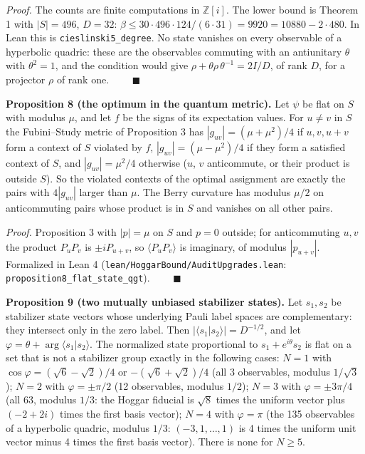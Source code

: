 \documentclass[11pt,a4paper]{article}
\begin{document}
\emph{Proof.} The counts are finite computations in \(\mathbb{Z}[i]\). The lower bound is Theorem 1 with
\(|S| = 496\), \(D = 32\): \(\beta \le 30 \cdot 496 \cdot 124/(6 \cdot 31) = 9920 = 10880 - 2\cdot 480\). In Lean
this is \nolinkurl{cieslinski5_degree}. No state vanishes on every observable of a hyperbolic quadric: these are the
observables commuting with an antiunitary \(\theta\) with \(\theta^2 = 1\), and the condition would give
\(\rho + \theta\rho\,\theta^{-1} = 2I/D\), of rank \(D\), for a projector \(\rho\) of rank one. \(\qquad\blacksquare\)

\textbf{Proposition 8 (the optimum in the quantum metric).} Let \(\psi\) be flat on \(S\) with modulus \(\mu\), and
let \(f\) be the signs of its expectation values. For \(u \ne v\) in \(S\) the Fubini--Study metric of
Proposition 3 has \(|g_{uv}| = (\mu + \mu^2)/4\) if \(u, v, u+v\) form a context of \(S\) violated by \(f\),
\(|g_{uv}| = (\mu - \mu^2)/4\) if they form a satisfied context of \(S\), and \(|g_{uv}| = \mu^2/4\) otherwise
(\(u\), \(v\) anticommute, or their product is outside \(S\)). So the violated contexts of the optimal
assignment are exactly the pairs with \(4|g_{uv}|\) larger than \(\mu\). The Berry curvature has modulus
\(\mu/2\) on anticommuting pairs whose product is in \(S\) and vanishes on all other pairs.

\emph{Proof.} Proposition 3 with \(|p| = \mu\) on \(S\) and \(p = 0\) outside; for anticommuting \(u, v\) the product
\(P_uP_v\) is \(\pm i P_{u+v}\), so \(\langle P_uP_v\rangle\) is imaginary, of modulus \(|p_{u+v}|\). Formalized
in Lean 4 (\nolinkurl{lean/HoggarBound/AuditUpgrades.lean}: \nolinkurl{proposition8_flat_state_qgt}).
\(\qquad\blacksquare\)

\textbf{Proposition 9 (two mutually unbiased stabilizer states).} Let \(s_1, s_2\) be stabilizer state vectors
whose underlying Pauli label spaces are complementary: they intersect only in the zero label.
Then \(|\langle s_1|s_2\rangle| = D^{-1/2}\),
and let \(\varphi = \theta + \arg\langle s_1|s_2\rangle\). The normalized state proportional to
\(s_1 + e^{i\theta}s_2\) is flat on a set that is not a stabilizer group exactly in the following cases:
\(N = 1\) with \(\cos\varphi = (\sqrt6 - \sqrt2)/4\) or \(-(\sqrt6 + \sqrt2)/4\) (all 3 observables, modulus
\(1/\sqrt3\)); \(N = 2\) with \(\varphi = \pm\pi/2\) (12 observables, modulus \(1/2\)); \(N = 3\) with
\(\varphi = \pm 3\pi/4\) (all 63, modulus \(1/3\): the Hoggar fiducial is \(\sqrt8\) times the uniform vector
plus \((-2+2i)\) times the first basis vector); \(N = 4\) with \(\varphi = \pi\) (the 135 observables of a
hyperbolic quadric, modulus \(1/3\): \((-3,1,\dots,1)\) is 4 times the uniform unit vector minus 4 times the
first basis vector). There is none for \(N \ge 5\).
\end{document}
